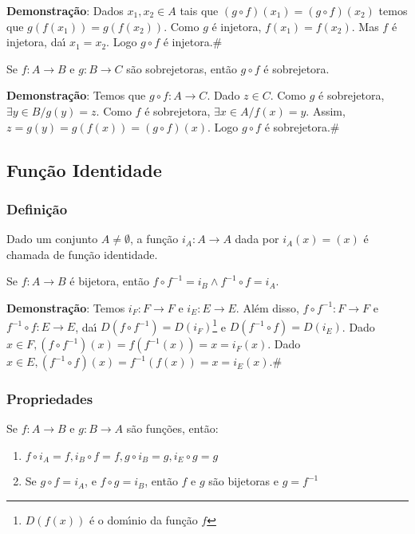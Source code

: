 \textbf{Demonstra{\c c}{\~a}o}: Dados $x_{1},x_{2}\in A$ tais que $(g\circ f)(x_{1})=(g\circ f)(x_{2})$ temos que $g(f(x_{1}))=g(f(x_{2}))$. Como $g$ {\'e} injetora, $f(x_{1})=f(x_{2})$. Mas $f$ {\'e} injetora, da{\'\i} $x_{1}=x_{2}$. Logo $g\circ f$ {\'e} injetora.\#

\begin{proposicao} Se $f:A\rightarrow B$ e $g:B\rightarrow C$ s{\~a}o sobrejetoras, ent{\~a}o $g\circ f$ {\'e} sobrejetora.\end{proposicao}

\textbf{Demonstra{\c c}{\~a}o}: Temos que $g\circ f:A\rightarrow C$. Dado $z\in C$. Como $g$ {\'e} sobrejetora, $\exists y\in B/g(y)=z$. Como $f$ {\'e} sobrejetora, $\exists x\in A/f(x)=y$. Assim, $z=g(y)=g(f(x))=(g\circ f)(x)$. Logo $g\circ f$ {\'e} sobrejetora.\#

\subsection{Fun{\c c}{\~a}o Identidade}
\subsubsection{Defini{\c c}{\~a}o}
\begin{definicao} Dado um conjunto $A\neq\emptyset$, a fun{\c c}{\~a}o $i_{A}:A\rightarrow A$ dada por $i_{A}(x)=(x)$ {\'e} chamada de fun{\c c}{\~a}o identidade.\end{definicao}

\begin{proposicao}
Se $f:A\rightarrow B$ {\'e} bijetora, ent{\~a}o $f\circ f^{-1}=i_{B}\wedge f^{-1}\circ f=i_{A}$.
\end{proposicao}

\textbf{Demonstra{\c c}{\~a}o}: Temos $i_{F}:F\rightarrow F$ e $i_{E}:E\rightarrow E$. Al{\'e}m disso, $f\circ f^{-1}:F\rightarrow F$ e $f^{-1}\circ f:E\rightarrow E$, da{\'\i} $D(f\circ f^{-1})=D(i_{F})$\footnote{$D(f(x))$ {\'e} o dom{\'\i}nio da fun{\c c}{\~a}o $f$} e $D(f^{-1}\circ f)=D(i_{E})$. Dado $x\in F, (f\circ f^{-1})(x)=f(f^{-1}(x))=x=i_{F}(x)$. Dado $x\in E, (f^{-1}\circ f)(x)=f^{-1}(f(x))=x=i_{E}(x)$.\#

\subsubsection{Propriedades}
\begin{proposicao} Se $f:A\rightarrow B$ e $g:B\rightarrow A$ s{\~a}o fun{\c c}{\~o}es, ent{\~a}o:
\begin{enumerate}
\item $f\circ i_{A}=f, i_{B}\circ f=f, g\circ i_{B}=g, i_{E}\circ g=g$
\item Se $g\circ f=i_{A}$, e $f\circ g=i_{B}$, ent{\~a}o $f$ e $g$ s{\~a}o bijetoras e $g=f^{-1}$
\end{enumerate}
\end{proposicao}


